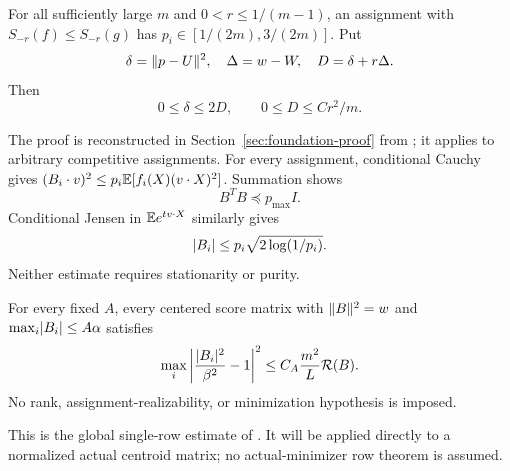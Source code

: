 \begin{prior}
\label{prior:localization}
For all sufficiently large $m$ and $0<r\le1/(m-1)$, an assignment with
$S_{-r}(f)\le S_{-r}(g)$ has $p_i\in[1/(2m),3/(2m)]$. Put
\[
 \delta=\lVert p-U\rVert^2,\quad \Delta=w-W,\quad D=\delta+r\Delta.
\]
Then
\begin{equation}\label{eq:localization}
              0\le\delta\le2D,\qquad 0\le D\le Cr^2/m.
\end{equation}
\end{prior}
The proof is reconstructed in Section~\ref{sec:foundation-proof} from
\cite{localization,currentassembly}; it applies to arbitrary competitive assignments. For every assignment,
conditional Cauchy gives
$(B_i\cdot v)^2\le p_i\mathbb E[f_i(X)(v\cdot X)^2]$. Summation shows
\begin{equation}\label{eq:actual-operator}
                              B^TB\preceq p_{\max}I.
\end{equation}
Conditional Jensen in $\mathbb E e^{t v\cdot X}$ similarly gives
\begin{equation}\label{eq:entropy-centroid}
                 \lvert B_i\rvert\le p_i\sqrt{2\log(1/p_i)}.
\end{equation}
Neither estimate requires stationarity or purity.

\begin{prior}\label{prior:one-row}
For every fixed $A$, every centered score matrix with
$\lVert B\rVert^2=w$ and $\max_i\lvert B_i\rvert\le A\alpha$ satisfies
\begin{equation}\label{eq:one-row}
 \max_i\left|\frac{\lvert B_i\rvert^2}{\beta^2}-1\right|^2
                         \le C_A\frac{m^2}{L}\mathcal R(B).
\end{equation}
No rank, assignment-realizability, or minimization hypothesis is imposed.
\end{prior}
This is the global single-row estimate of \cite[Theorem~1]{rowcontrol}.
It will be applied directly to a normalized actual centroid matrix;
no actual-minimizer row theorem is assumed.

